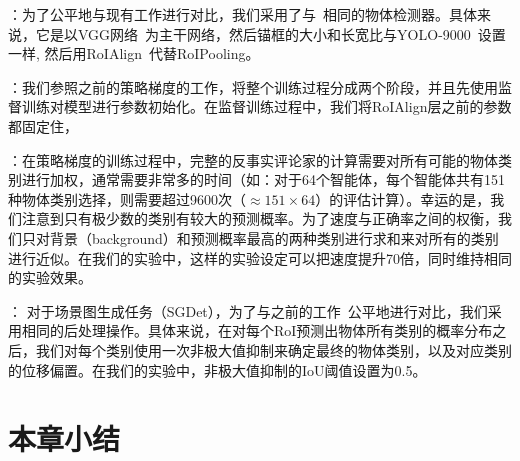 ：为了公平地与现有工作进行对比，我们采用了与~\cite{zellers2018neural}相同的物体检测器。具体来说，它是以VGG网络~\cite{simonyan2015very}为主干网络，然后锚框的大小和长宽比与YOLO-9000~\cite{redmon2017yolo9000}设置一样, 然后用RoIAlign~\cite{he2017mask}代替RoIPooling。


：我们参照之前的策略梯度的工作，将整个训练过程分成两个阶段，并且先使用监督训练对模型进行参数初始化。在监督训练过程中，我们将RoIAlign层之前的参数都固定住，


：在策略梯度的训练过程中，完整的反事实评论家的计算需要对所有可能的物体类别进行加权，通常需要非常多的时间（如：对于64个智能体，每个智能体共有151种物体类别选择，则需要超过9600次（$\approx 151 \times 64$）的评估计算）。幸运的是，我们注意到只有极少数的类别有较大的预测概率。为了速度与正确率之间的权衡，我们只对背景（background）和预测概率最高的两种类别进行求和来对所有的类别进行近似。在我们的实验中，这样的实验设定可以把速度提升70倍，同时维持相同的实验效果。


： 对于场景图生成任务（SGDet），为了与之前的工作~\cite{zellers2018neural,zhang2019graphical}公平地进行对比，我们采用相同的后处理操作。具体来说，在对每个RoI预测出物体所有类别的概率分布之后，我们对每个类别使用一次非极大值抑制来确定最终的物体类别，以及对应类别的位移偏置。在我们的实验中，非极大值抑制的IoU阈值设置为0.5。

\section{本章小结}